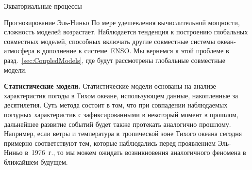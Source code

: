 \begin{chapter}{Экваториальные процессы}
\begin{section}{Прогнозирование Эль-Ниньо}
По мере удешевления вычислительной мощности, сложность моделей возрастает.
Наблюдается тенденция к построению глобальных совместных моделей, способных
включать другие совместные системы океан-атмосфера в дополнение к 
системе~ENSO. 
Мы вернемся к этой проблеме в разд.~\ref{sec:CoupledModels}, где будут
рассмотрены глобальные совместные модели.
%

\textbf{Статистические модели.} Статистические модели основаны на
анализе характеристик погоды в Тихом океане, использующем данные, накопленные
за десятилетия. Суть метода состоит в том, что при совпадении наблюдаемых
погодных характеристик с зафиксированными в некоторый момент в прошлом,
дальнейшее развитие событий будет также протекать аналогично прошлому.
Например, если ветры и температура в тропической зоне Тихого океана сегодня
примерно соответствуют тем, которые наблюдались перед проявлением Эль-Ниньо
в~1976~г., то мы можем ожидать возникновения аналогичного феномена в 
ближайшем будущем.
%


\end{section}
\end{chapter}
